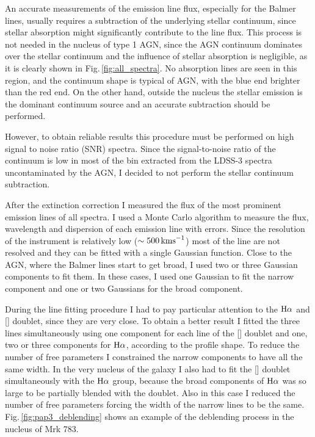 \documentclass[../main.tex]{subfiles}
\begin{document}
An accurate measurements of the emission line flux, especially for the Balmer lines, usually requires a subtraction of the underlying stellar continuum, since stellar absorption might significantly contribute to the line flux.
This process is not needed in the nucleus of type 1 AGN, since the AGN continuum dominates over the stellar continuum and the influence of stellar absorption is negligible, as it is clearly shown in Fig.\,\ref{fig:all_spectra}.
No absorption lines are seen in this region, and the continuum shape is typical of AGN, with the blue end brighter than the red end.
On the other hand, outside the nucleus the stellar emission is the dominant continuum source and an accurate subtraction should be performed.

However, to obtain reliable results this procedure must be performed on high signal to noise ratio (SNR) spectra.
Since the signal-to-noise ratio of the continuum is low in most of the bin extracted from the LDSS-3 spectra uncontaminated by the AGN, I decided to not perform the stellar continuum subtraction.

After the extinction correction I measured the flux of the most prominent emission lines of all spectra.
I used a Monte Carlo algorithm to measure the flux, wavelength and dispersion of each emission line with errors.
Since the resolution of the instrument is relatively low ($\sim 500\,\si{\kms}$) most of the line are not resolved and they can be fitted with a single Gaussian function.
Close to the AGN, where the Balmer lines start to get broad, I used two or three Gaussian components to fit them.
In these cases, I used one Gaussian to fit the narrow component and one or two Gaussians for the broad component.

During the line fitting procedure I had to pay particular attention to the $\Ha$ and [] doublet, since they are very close.
To obtain a better result I fitted the three lines simultaneously using one component for each line of the [] doublet and one, two or three components for $\Ha$, according to the profile shape.
To reduce the number of free parameters I constrained the narrow components to have all the same width.
In the very nucleus of the galaxy I also had to fit the [] doublet  simultaneously with the $\Ha$ group, because the broad components of $\Ha$ was so large to be partially blended with the doublet.
Also in this case I reduced the number of free parameters forcing the width of the narrow lines to be the same.
Fig.\,\ref{fig:pap3_deblending} shows an example of the deblending process in the nucleus of Mrk 783.
\end{document}
